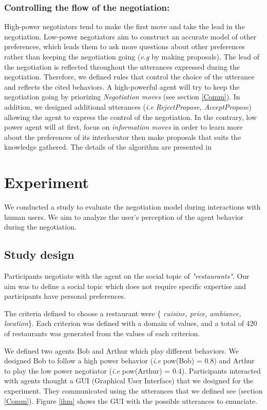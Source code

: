 \documentclass[runningheads,a4paper]{llncs}
\begin{document}
	\subsubsection{Controlling the flow of the negotiation:}
	High-power negotiators tend to make the first move \cite{magee2007power} and take the lead in the negotiation. Low-power negotiators aim to construct an accurate model of other preferences, which leads them to ask more questions about other preferences rather than keeping the negotiation going (\emph{e.g} by making proposals)\cite{de2004influence}.
	The lead of the negotiation is reflected throughout the utterances expressed during the negotiation. Therefore, we defined rules that control the choice of the utterance and reflects the cited behaviors. A high-powerful agent will try to keep the negotiation going by priorizing \emph{Negotiation moves} (see section \ref{Comm}). In addition, we designed additional utterances (\textit{i.e} \emph{RejectPropose, AcceptPropose}) allowing the agent to express the control of the negotiation.
	In the contrary, low power agent will at first, focus on \emph{information moves} in order to learn more about the preferences of its interlocutor then make proposals that suits the knowledge gathered. 
	The details of the algorithm are presented in \cite {ouali2017computational}
	
	\section{Experiment}
	We conducted a study to evaluate the negotiation model during interactions with human users. We aim to analyze the user's perception of the agent behavior during the negotiation.
	
	\subsection{Study design}
	
	Participants negotiate with the agent on the social topic of \emph{"restaurants"}. Our aim was to define a social topic which does not require specific expertise and participants have personal preferences.
	
	The criteria defined to choose a restaurant were \{ \textit{cuisine, price, ambiance, location}\}. Each criterion was defined with a domain of values, and a total of 420 of restaurants was generated from the values of each criterion.
	
	We defined two agents Bob and Arthur which play different behaviors. We designed Bob to follow a high power behavior (\textit{i.e} pow(Bob) = 0.8) and Arthur to play the low power negotiator (\textit{i.e} pow(Arthur) = 0.4).
	Participants interacted with agents thought a GUI (Graphical User Interface) that we designed for the experiment. They communicated using the utterances that we defined see (section \ref{Comm}). Figure \ref{ihm} shows the GUI with the possible utterances to enunciate.
	
\end{document}
